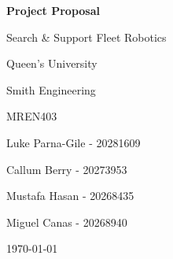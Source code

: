 \begin{titlepage}
    \centering
    \vspace*{2cm}
    {\Huge \textbf{Project Proposal}\par}
    \vspace{1cm}
    {\LARGE Search \& Support Fleet Robotics\par}
    
    \vspace{3cm}
    {\Large Queen’s University\par}
    {\Large Smith Engineering\par}
    {\Large MREN403\par}
    
    \vfill
    {\large Luke Parna-Gile - 20281609 \par}
    {\large Callum Berry - 20273953 \par}
    {\large Mustafa Hasan - 20268435 \par}
    {\large Miguel Canas - 20268940 \par}
    
    \vspace{2cm}
    {\large \today \par}
\end{titlepage}
